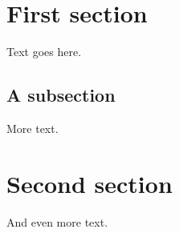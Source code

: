 \documentclass[10pt,a4paper]{article}
\begin{document}
\maketitle

\tableofcontents

\section{First section}

Text goes here.

\subsection{A subsection}

More text.

\section{Second section}

And even more text.
\end{document}
